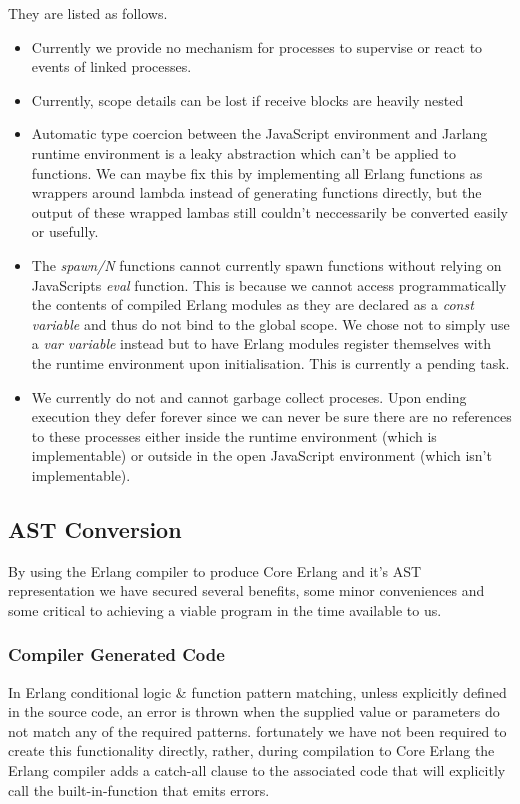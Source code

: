 \documentclass[twoside,12pt,titlepage,a4paper]{article}
\begin{document}
They are listed as follows.

\begin{itemize}
\item Currently we provide no mechanism for processes to supervise or react to events of linked processes.
\item Currently, scope details can be lost if receive blocks are heavily nested
\item Automatic type coercion between the JavaScript environment and Jarlang runtime environment is a leaky abstraction which can't be applied to functions. We can maybe fix this by implementing all Erlang functions as wrappers around lambda instead of generating functions directly, but the output of these wrapped lambas still couldn't neccessarily be converted easily or usefully.
\item The \textit{spawn/N} functions cannot currently spawn functions without relying on JavaScripts \textit{eval} function. This is because we cannot access programmatically the contents of compiled Erlang modules as they are declared as a \textit{const variable} and thus do not bind to the global scope. We chose not to simply use a \textit{var variable} instead but to have Erlang modules register themselves with the runtime environment upon initialisation. This is currently a pending task.
\item We currently do not and cannot garbage collect proceses. Upon ending execution they defer forever since we can never be sure there are no references to these processes either inside the runtime environment (which is implementable) or outside in the open JavaScript environment (which isn't implementable).
\end{itemize}

\subsection{AST Conversion}
By using the Erlang compiler to produce Core Erlang and it's AST representation we have secured several benefits, some minor conveniences and some critical to achieving a viable program in the time available to us.
\subsubsection{Compiler Generated Code}
In Erlang conditional logic \& function pattern matching, unless explicitly defined in the source code, an error is thrown when the supplied value or parameters do not match any of the required patterns. fortunately we have not been required to create this functionality directly, rather, during compilation to Core Erlang the Erlang compiler adds a catch-all clause to the associated code that will explicitly call the built-in-function that emits errors.
\end{document}
